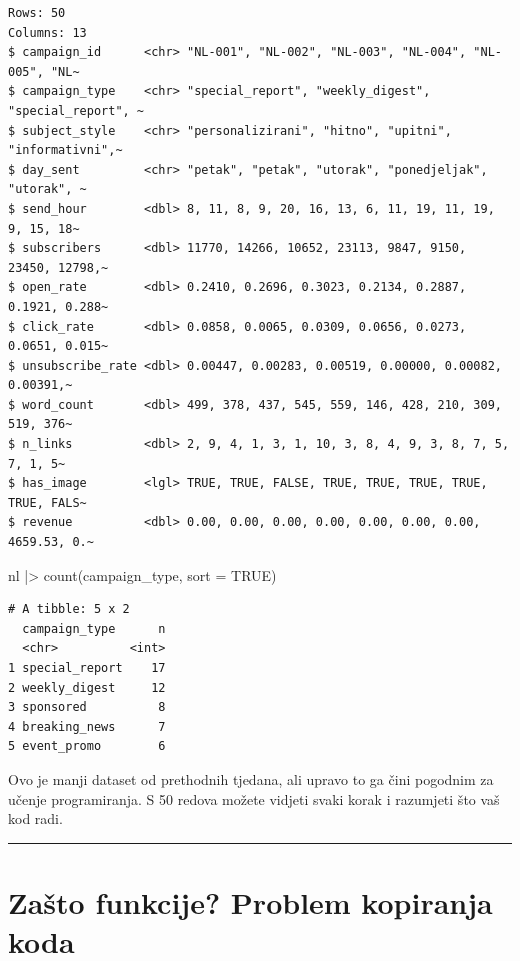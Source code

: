 \documentclass[
  croatian,
  letterpaper,
  DIV=11,
  numbers=noendperiod]{scrartcl}
\newenvironment{Shaded}{\begin{snugshade}}{\end{snugshade}}
\newcommand{\AttributeTok}[1]{\textcolor[rgb]{0.40,0.45,0.13}{#1}}
\newcommand{\ConstantTok}[1]{\textcolor[rgb]{0.56,0.35,0.01}{#1}}
\newcommand{\FunctionTok}[1]{\textcolor[rgb]{0.28,0.35,0.67}{#1}}
\newcommand{\NormalTok}[1]{\textcolor[rgb]{0.00,0.23,0.31}{#1}}
\newcommand{\SpecialCharTok}[1]{\textcolor[rgb]{0.37,0.37,0.37}{#1}}
\begin{document}
\begin{verbatim}
Rows: 50
Columns: 13
$ campaign_id      <chr> "NL-001", "NL-002", "NL-003", "NL-004", "NL-005", "NL~
$ campaign_type    <chr> "special_report", "weekly_digest", "special_report", ~
$ subject_style    <chr> "personalizirani", "hitno", "upitni", "informativni",~
$ day_sent         <chr> "petak", "petak", "utorak", "ponedjeljak", "utorak", ~
$ send_hour        <dbl> 8, 11, 8, 9, 20, 16, 13, 6, 11, 19, 11, 19, 9, 15, 18~
$ subscribers      <dbl> 11770, 14266, 10652, 23113, 9847, 9150, 23450, 12798,~
$ open_rate        <dbl> 0.2410, 0.2696, 0.3023, 0.2134, 0.2887, 0.1921, 0.288~
$ click_rate       <dbl> 0.0858, 0.0065, 0.0309, 0.0656, 0.0273, 0.0651, 0.015~
$ unsubscribe_rate <dbl> 0.00447, 0.00283, 0.00519, 0.00000, 0.00082, 0.00391,~
$ word_count       <dbl> 499, 378, 437, 545, 559, 146, 428, 210, 309, 519, 376~
$ n_links          <dbl> 2, 9, 4, 1, 3, 1, 10, 3, 8, 4, 9, 3, 8, 7, 5, 7, 1, 5~
$ has_image        <lgl> TRUE, TRUE, FALSE, TRUE, TRUE, TRUE, TRUE, TRUE, FALS~
$ revenue          <dbl> 0.00, 0.00, 0.00, 0.00, 0.00, 0.00, 0.00, 4659.53, 0.~
\end{verbatim}

\begin{Shaded}
\begin{Highlighting}[]
\NormalTok{nl }\SpecialCharTok{|\textgreater{}}
  \FunctionTok{count}\NormalTok{(campaign\_type, }\AttributeTok{sort =} \ConstantTok{TRUE}\NormalTok{)}
\end{Highlighting}
\end{Shaded}

\begin{verbatim}
# A tibble: 5 x 2
  campaign_type      n
  <chr>          <int>
1 special_report    17
2 weekly_digest     12
3 sponsored          8
4 breaking_news      7
5 event_promo        6
\end{verbatim}

Ovo je manji dataset od prethodnih tjedana, ali upravo to ga čini
pogodnim za učenje programiranja. S 50 redova možete vidjeti svaki korak
i razumjeti što vaš kod radi.

\begin{center}\rule{0.5\linewidth}{0.5pt}\end{center}

\section{Zašto funkcije? Problem kopiranja
koda}\label{sec-zasto-funkcije}
\end{document}
